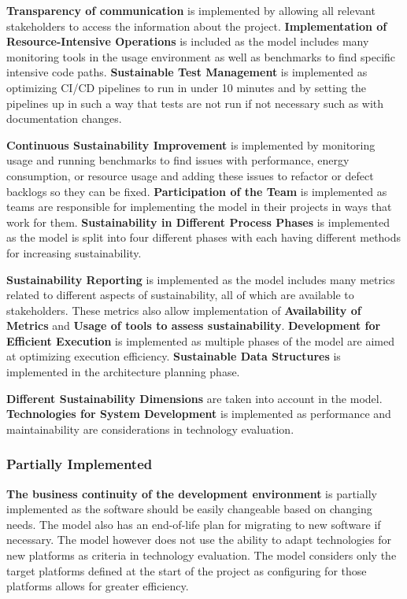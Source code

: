\textbf{Transparency of communication} is implemented by allowing all relevant stakeholders to access the information about the project. \textbf{Implementation of Resource-Intensive Operations} is included as the model includes many monitoring tools in the usage environment as well as benchmarks to find specific intensive code paths. \textbf{Sustainable Test Management} is implemented as optimizing CI/CD pipelines to run in under 10 minutes and by setting the pipelines up in such a way that tests are not run if not necessary such as with documentation changes.

\textbf{Continuous Sustainability Improvement} is implemented by monitoring usage and running benchmarks to find issues with performance, energy consumption, or resource usage and adding these issues to refactor or defect backlogs so they can be fixed. \textbf{Participation of the Team} is implemented as teams are responsible for implementing the model in their projects in ways that work for them. \textbf{Sustainability in Different Process Phases} is implemented as the model is split into four different phases with each having different methods for increasing sustainability.

\textbf{Sustainability Reporting} is implemented as the model includes many metrics related to different aspects of sustainability, all of which are available to stakeholders. These metrics also allow implementation of \textbf{Availability of Metrics} and \textbf{Usage of tools to assess sustainability}. \textbf{Development for Efficient Execution} is implemented as multiple phases of the model are aimed at optimizing execution efficiency. \textbf{Sustainable Data Structures} is implemented in the architecture planning phase.

\textbf{Different Sustainability Dimensions} are taken into account in the model. \textbf{Technologies for System Development} is implemented as performance and maintainability are considerations in technology evaluation.

\subsubsection{Partially Implemented}
\textbf{The business continuity of the development environment} is partially implemented as the software should be easily changeable based on changing needs. The model also has an end-of-life plan for migrating to new software if necessary. The model however does not use the ability to adapt technologies for new platforms as criteria in technology evaluation. The model considers only the target platforms defined at the start of the project as configuring for those platforms allows for greater efficiency.

